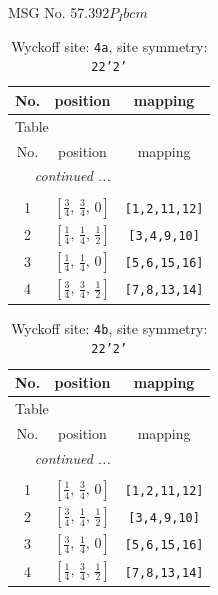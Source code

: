 \documentclass[fleqn,8pt]{jsarticle}
\begin{document}
\setcounter{MaxMatrixCols}{32}

\renewcommand{\tablename}{Table~}
\renewcommand{\figurename}{Figure~}
\begin{center}
\LARGE
MSG No. 57.392\quad$P_{I}bcm$
\end{center}
\renewcommand{\arraystretch}{1.2}
\begin{longtable}{ccc}
\caption{Wyckoff site: {\tt 4a}, site symmetry: {\tt 22'2'}}
 \\
 \hline \hline
No. & position & mapping \\ \hline \endfirsthead

\multicolumn{2}{l}{\tablename\ \thetable{}} \\
 \hline \hline
No. & position & mapping \\ \hline \endhead

 \hline \hline
\multicolumn{2}{r}{\footnotesize\it continued ...} \\ \endfoot

 \hline \hline
\multicolumn{2}{r}{} \\ \endlastfoot

1 & $\left[ \frac{3}{4},\, \frac{3}{4},\, 0 \right]$ & {\tt [1,2,11,12]} \\ \hline
2 & $\left[ \frac{1}{4},\, \frac{1}{4},\, \frac{1}{2} \right]$ & {\tt [3,4,9,10]} \\ \hline
3 & $\left[ \frac{1}{4},\, \frac{1}{4},\, 0 \right]$ & {\tt [5,6,15,16]} \\ \hline
4 & $\left[ \frac{3}{4},\, \frac{3}{4},\, \frac{1}{2} \right]$ & {\tt [7,8,13,14]} \\
\end{longtable}
\renewcommand{\arraystretch}{1.2}
\begin{longtable}{ccc}
\caption{Wyckoff site: {\tt 4b}, site symmetry: {\tt 22'2'}}
 \\
 \hline \hline
No. & position & mapping \\ \hline \endfirsthead

\multicolumn{2}{l}{\tablename\ \thetable{}} \\
 \hline \hline
No. & position & mapping \\ \hline \endhead

 \hline \hline
\multicolumn{2}{r}{\footnotesize\it continued ...} \\ \endfoot

 \hline \hline
\multicolumn{2}{r}{} \\ \endlastfoot

1 & $\left[ \frac{1}{4},\, \frac{3}{4},\, 0 \right]$ & {\tt [1,2,11,12]} \\ \hline
2 & $\left[ \frac{3}{4},\, \frac{1}{4},\, \frac{1}{2} \right]$ & {\tt [3,4,9,10]} \\ \hline
3 & $\left[ \frac{3}{4},\, \frac{1}{4},\, 0 \right]$ & {\tt [5,6,15,16]} \\ \hline
4 & $\left[ \frac{1}{4},\, \frac{3}{4},\, \frac{1}{2} \right]$ & {\tt [7,8,13,14]} \\
\end{longtable}
\end{document}
